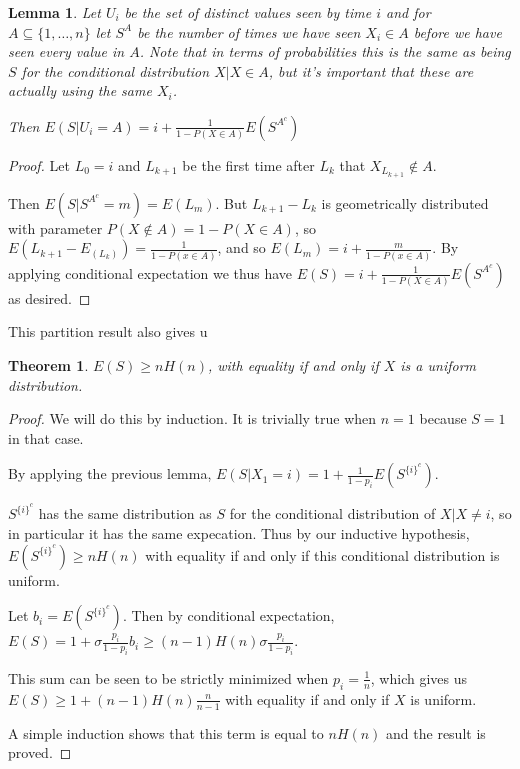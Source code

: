 \documentclass[a4paper]{book}
\newtheorem{lemma}{Lemma}[section]
\newtheorem{theorem}{Theorem}[section]
\begin{document}
\begin{lemma}\label{lemma:couponpartition}
Let \(U_i\) be the set of distinct values seen by time \(i\) and for \(A \subseteq \{1, \ldots, n\}\) let \(S^A\) be the number of times we have seen \(X_i \in A\) before we have seen every value in \(A\).
Note that in terms of probabilities this is the same as being \(S\) for the conditional distribution \(X | X \in A\),
but it's important that these are actually using the same \(X_i\).

Then \(E(S|U_i = A) = i + \frac{1}{1 - P(X \in A)} E(S^{A^c})\)
\end{lemma}

\begin{proof}
Let \(L_0 = i\) and \(L_{k + 1}\) be the first time after \(L_k\) that \(X_{L_{k + 1}} \not\in A\).

Then \(E(S | S^{A^c} = m) = E(L_m)\).
But \(L_{k + 1} - L_{k}\) is geometrically distributed with parameter \(P(X \not\in A) = 1 - P(X \in A)\),
so \(E(L_{k + 1} - E_(L_k)) = \frac{1}{1 - P(x \in A)}\),
and so \(E(L_m) = i + \frac{m}{1 - P(x \in A)}\).
By applying conditional expectation we thus have \(E(S) = i + \frac{1}{1 - P(X \in A)} E(S^{A^c})\) as desired.
\end{proof}

This partition result also gives u

\begin{theorem}
\(E(S) \geq n H(n)\), with equality if and only if \(X\) is a uniform distribution.
\end{theorem}

\begin{proof}
We will do this by induction.
It is trivially true when \(n = 1\) because \(S = 1\) in that case.

By applying the previous lemma,
\(E(S | X_1 = i) = 1 + \frac{1}{1 - p_i} E(S^{{\{i\}}^c})\).

\(S^{{\{i\}}^c}\) has the same distribution as \(S\) for the conditional distribution of \(X | X \neq i\),
so in particular it has the same expecation.
Thus by our inductive hypothesis,
\(E(S^{{\{i\}}^c}) \geq n H(n)\) with equality if and only if this conditional distribution is uniform.

Let \(b_i = E(S^{{\{i\}}^c})\).
Then by conditional expectation,
\(E(S) = 1 + \sigma \frac{p_i}{1 - p_i} b_i \geq (n - 1) H(n) \sigma \frac{p_i}{1 - p_i} \).

This sum can be seen to be strictly minimized when \(p_i = \frac{1}{n}\),
which gives us \(E(S) \geq 1 + (n - 1) H(n) \frac{n}{n - 1}\) with equality if and only if \(X\) is uniform.

A simple induction shows that this term is equal to \(n H(n)\) and the result is proved.
\end{proof}
\end{document}
